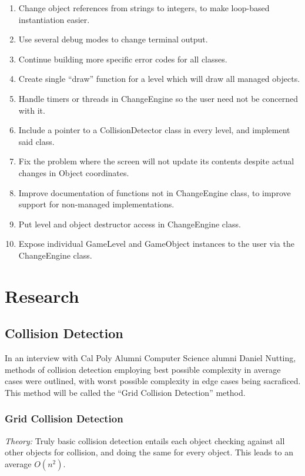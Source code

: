 \documentclass[12pt]{article}
\begin{document}
\begin{enumerate}
 \item Change object references from strings to integers, to make loop-based instantiation easier.
 \item Use several debug modes to change terminal output.
 \item Continue building more specific error codes for all classes.
 \item Create single ``draw'' function for a level which will draw all managed objects.
 \item Handle timers or threads in ChangeEngine so the user need not be concerned with it.
 \item Include a pointer to a CollisionDetector class in every level, and implement said class.
 \item Fix the problem where the screen will not update its contents despite actual changes in Object coordinates.
 \item Improve documentation of functions not in ChangeEngine class, to improve support for non-managed implementations.
 \item Put level and object destructor access in ChangeEngine class.
 \item Expose individual GameLevel and GameObject instances to the user via the ChangeEngine class.
\end{enumerate}


  \newpage

  \appendix
  \section{Research}

  \subsection{Collision Detection}
    In an interview with Cal Poly Alumni Computer Science alumni Daniel Nutting, methods of collision detection employing best possible complexity in average cases were outlined, with worst possible complexity in edge cases being sacraficed. This method will be called the ``Grid Collision Detection'' method.

    \subsubsection{Grid Collision Detection}
      \emph{Theory: } Truly basic collision detection entails each object checking against all other objects for collision, and doing the same for every object. This leads to an average $O(n^2)$.
\end{document}
